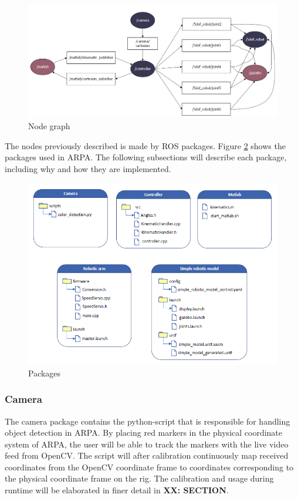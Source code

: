\documentclass[11pt,a4paper, titlepage]{article}
\begin{document}
	\begin{figure}[H]
		\includegraphics[width=\linewidth]{../Diagrams/NodeGraph-v1.png}
		\caption{Node graph}
		\label{fig:nodegraph}
	\end{figure}
	

The nodes previously described is made by ROS packages. Figure \ref{fig:dir-list} shows the packages used in ARPA. The following subsections will describe each package, including why and how they are implemented.

	\begin{figure}[H]
		\includegraphics[width=\linewidth]{../Diagrams/Packages.png}
		\caption{Packages}
		\label{fig:dir-list}
	\end{figure}
	
	
\subsubsection{Camera}
The camera package contains the python-script that is responsible for handling object detection in ARPA. By placing red markers in the physical coordinate system of ARPA, the user will be able to track the markers with the live video feed from OpenCV. The script will after calibration continuously map received coordinates from the OpenCV coordinate frame to coordinates corresponding to the physical coordinate frame on the rig. The calibration and usage during runtime will be elaborated in finer detail in \textbf{XX: SECTION}.
\end{document}
